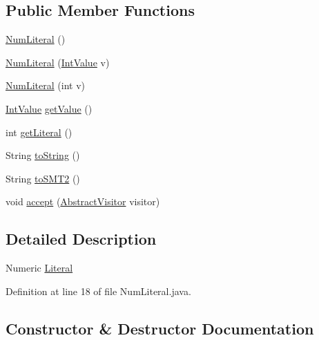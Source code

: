 \subsection*{Public Member Functions}
\begin{DoxyCompactItemize}
\item 
\hyperlink{classuran_1_1formula_1_1_num_literal_ab5f51d42c30b78bb92d0f81b11de74b2}{Num\+Literal} ()
\item 
\hyperlink{classuran_1_1formula_1_1_num_literal_adbe8e877d682a661601384af835fb00c}{Num\+Literal} (\hyperlink{classuran_1_1formula_1_1value_1_1_int_value}{Int\+Value} v)
\item 
\hyperlink{classuran_1_1formula_1_1_num_literal_a333acaa358eab1eb223f272ff2b4e9bb}{Num\+Literal} (int v)
\item 
\hyperlink{classuran_1_1formula_1_1value_1_1_int_value}{Int\+Value} \hyperlink{classuran_1_1formula_1_1_num_literal_ae0dadbefcc69349f5bd80fbf9140001a}{get\+Value} ()
\item 
int \hyperlink{classuran_1_1formula_1_1_num_literal_a79f2cf4b24ef2e670a574787bd308954}{get\+Literal} ()
\item 
String \hyperlink{classuran_1_1formula_1_1_num_literal_abf0b7431a2da3673ce8af875f66dc159}{to\+String} ()
\item 
String \hyperlink{classuran_1_1formula_1_1_num_literal_a09557ce20900450f1263e672a90cd5c6}{to\+S\+M\+T2} ()
\item 
void \hyperlink{classuran_1_1formula_1_1_num_literal_a2756adaea87c705446096fcebb6a04ac}{accept} (\hyperlink{classuran_1_1formula_1_1visitor_1_1_abstract_visitor}{Abstract\+Visitor} visitor)
\end{DoxyCompactItemize}


\subsection{Detailed Description}
Numeric \hyperlink{classuran_1_1formula_1_1_literal}{Literal} 

Definition at line 18 of file Num\+Literal.\+java.



\subsection{Constructor \& Destructor Documentation}
\hypertarget{classuran_1_1formula_1_1_num_literal_ab5f51d42c30b78bb92d0f81b11de74b2}{}
